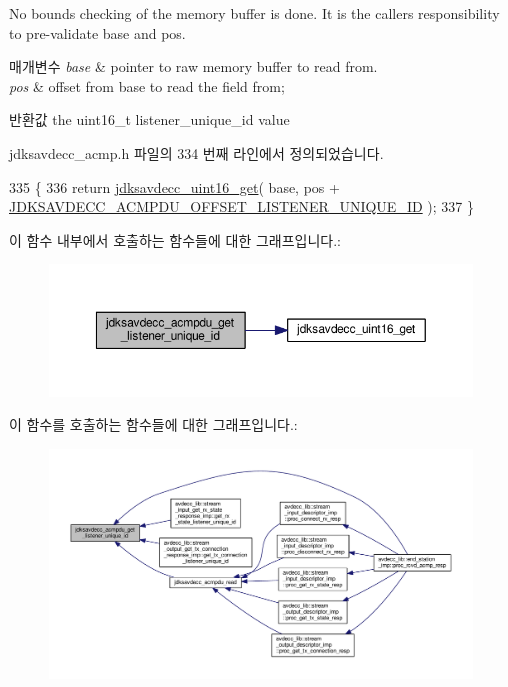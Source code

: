 No bounds checking of the memory buffer is done. It is the caller\textquotesingle{}s responsibility to pre-\/validate base and pos.


\begin{DoxyParams}{매개변수}
{\em base} & pointer to raw memory buffer to read from. \\
\hline
{\em pos} & offset from base to read the field from; \\
\hline
\end{DoxyParams}
\begin{DoxyReturn}{반환값}
the uint16\+\_\+t listener\+\_\+unique\+\_\+id value 
\end{DoxyReturn}


jdksavdecc\+\_\+acmp.\+h 파일의 334 번째 라인에서 정의되었습니다.


\begin{DoxyCode}
335 \{
336     \textcolor{keywordflow}{return} \hyperlink{group__endian_ga3fbbbc20be954aa61e039872965b0dc9}{jdksavdecc\_uint16\_get}( base, pos + 
      \hyperlink{group__acmpdu_ga95d610e339117734620bcf94935d4a8d}{JDKSAVDECC\_ACMPDU\_OFFSET\_LISTENER\_UNIQUE\_ID} );
337 \}
\end{DoxyCode}


이 함수 내부에서 호출하는 함수들에 대한 그래프입니다.\+:
\nopagebreak
\begin{figure}[H]
\begin{center}
\leavevmode
\includegraphics[width=350pt]{group__acmpdu_ga36867bfc130619cbea38caa3ce54bc89_cgraph}
\end{center}
\end{figure}




이 함수를 호출하는 함수들에 대한 그래프입니다.\+:
\nopagebreak
\begin{figure}[H]
\begin{center}
\leavevmode
\includegraphics[width=350pt]{group__acmpdu_ga36867bfc130619cbea38caa3ce54bc89_icgraph}
\end{center}
\end{figure}


